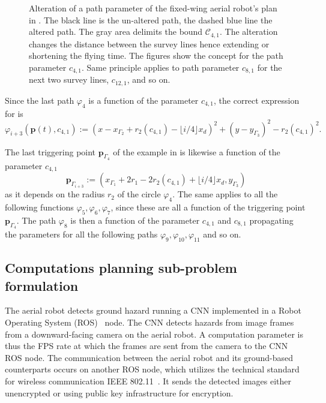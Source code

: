 \begin{figure}[p!]
  \centering
  
  \caption[Alteration of a path parameter of the fixed-wing aerial robot's plan]{Alteration of a path parameter of the fixed-wing aerial robot's plan in . The black line is the un-altered path, the dashed blue line the altered path. The gray area delimits the bound $\mathcal{C}_{4,1}$. The alteration changes the distance between the survey lines hence extending or shortening the flying time. The figures show the concept for the path parameter $c_{4,1}$. Same principle applies to path parameter $c_{8,1}$ for the next two survey lines, $c_{12,1}$, and so on.}
  \label{fig:plot5}
\end{figure}

Since the last path $\varphi_4$ is a function of the parameter $c_{4,1}$, the correct expression for  is 
\begin{equation}\label{eq:line-gene-param}
  \varphi_{i+3}(\mathbf{p}(t),c_{4,1}):=(x-x_{\Gamma_2}+r_2(c_{4,1})-\lfloor i/4\rfloor x_d)^2+(y-y_{\Gamma_3})^2-r_2(c_{4,1})^2.
\end{equation}

The last triggering point $\mathbf{p}_{\Gamma_4}$ of the example in  is likewise a function of the parameter $c_{4,1}$
\begin{equation}
  \mathbf{p}_{\Gamma_{i+3}}:=(x_{\Gamma_1}+2r_1-2r_2(c_{4,1})+\lfloor i/4\rfloor x_d,y_{\Gamma_3})
\end{equation}
as it depends on the radius $r_2$ of the circle $\varphi_4$. The same applies to all the following functions $\varphi_5,\varphi_6,\varphi_7$, since these are all a function of the triggering point $\mathbf{p}_{\Gamma_4}$. The path $\varphi_8$ is then a function of the parameter $c_{4,1}$ and $c_{8,1}$ propagating the parameters for all the following paths $\varphi_9,\varphi_{10},\varphi_{11}$ and so on.

\subsection{Computations planning sub-problem formulation}
\label{sec:computation-wise}

The aerial robot detects ground hazard running a CNN implemented in a Robot Operating System (ROS)~\citep{quigley2009ros} node. The CNN detects hazards from image frames from a downward-facing camera on the aerial robot. A computation parameter is thus the FPS rate at which the frames are sent from the camera to the CNN ROS node. The communication between the aerial robot and its ground-based counterparts occurs on another ROS node, which utilizes the technical standard for wireless communication IEEE 802.11~\citep{crow1997ieee}. It sends the detected images either unencrypted or using public key infrastructure for encryption.

